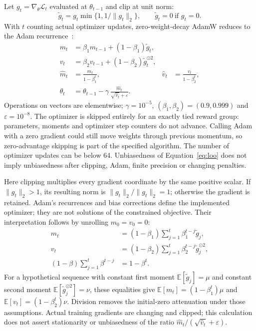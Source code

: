 \documentclass[11pt]{article}
\newcommand{\E}{\mathbb{E}}
\begin{document}
Let $g_t=\nabla_\theta\mathcal L_t$ evaluated at $\theta_{t-1}$ and clip at unit norm:
\begin{equation}
 \widetilde g_t=g_t\min\{1,1/\|g_t\|_2\},
 \qquad\widetilde g_t=0\ \text{if }g_t=0.
\end{equation}
With $t$ counting actual optimizer updates, zero-weight-decay AdamW reduces to the Adam recurrence~\cite{adam}:
\begin{align}
 m_t&=\beta_1m_{t-1}+(1-\beta_1)\widetilde g_t,\\
 v_t&=\beta_2v_{t-1}+(1-\beta_2)\widetilde g_t^{\odot2},\\
 \widehat m_t&=\frac{m_t}{1-\beta_1^t},&
 \widehat v_t&=\frac{v_t}{1-\beta_2^t},\\
 \theta_t&=\theta_{t-1}-\gamma\,
              \frac{\widehat m_t}{\sqrt{\widehat v_t}+\varepsilon}.
 \label{eq:adam}
\end{align}
Operations on vectors are elementwise; $\gamma=10^{-5}$, $(\beta_1,\beta_2)=(0.9,0.999)$ and $\varepsilon=10^{-8}$. The optimizer is skipped entirely for an exactly tied reward group: parameters, moments and optimizer step counters do not advance. Calling Adam with a zero gradient could still move weights through previous momentum, so zero-advantage skipping is part of the specified algorithm. The number of optimizer updates can be below 64. Unbiasedness of Equation~\eqref{eq:loo} does not imply unbiasedness after clipping, Adam, finite precision or changing penalties.

Here clipping multiplies every gradient coordinate by the same positive scalar. If $\|g_t\|_2>1$, its resulting norm is $\|g_t\|_2/\|g_t\|_2=1$; otherwise the gradient is retained. Adam's recurrences and bias corrections define the implemented optimizer; they are not solutions of the constrained objective. Their interpretation follows by unrolling $m_0=v_0=0$:
\begin{align}
 m_t&=(1-\beta_1)\sum_{j=1}^t\beta_1^{t-j}\widetilde g_j,\\
 v_t&=(1-\beta_2)\sum_{j=1}^t\beta_2^{t-j}\widetilde g_j^{\odot2},\\
 (1-\beta)\sum_{j=1}^t\beta^{t-j}&=1-\beta^t.
\end{align}
For a hypothetical sequence with constant first moment $\E[\widetilde g_j]=\mu$ and constant second moment $\E[\widetilde g_j^{\odot2}]=\nu$, these equalities give $\E[m_t]=(1-\beta_1^t)\mu$ and $\E[v_t]=(1-\beta_2^t)\nu$. Division removes the initial-zero attenuation under those assumptions. Actual training gradients are changing and clipped; this calculation does not assert stationarity or unbiasedness of the ratio $\widehat m_t/(\sqrt{\widehat v_t}+\varepsilon)$.
\end{document}
